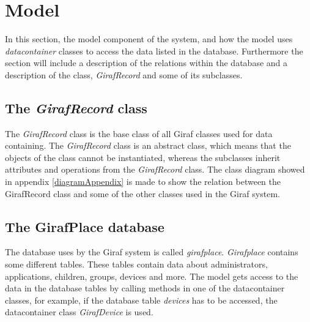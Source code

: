 \section{Model}
\label{model}

In this section, the model component of the system, and how the model uses \textit{datacontainer} classes to access the data listed in the database. Furthermore the section will include a description of the relations within the database and a description of the class, \textit{GirafRecord} and some of its subclasses.

\subsection{The \textit{GirafRecord} class}
The \textit{GirafRecord} class is the base class of all Giraf classes used for data containing. The \textit{GirafRecord} class is an abstract class, which means that the objects of the class cannot be instantiated, whereas the subclasses inherit attributes and operations from the \textit{GirafRecord} class. 
The class diagram showed in appendix \ref{diagramAppendix} is made to show the relation between the GirafRecord class and some of the other classes used in the Giraf system.
 


\subsection{The GirafPlace database}
The database uses by the Giraf system is called \textit{girafplace}. \textit{Girafplace} contains some different tables. These tables contain data about administrators, applications, children, groups, devices and more.
The model gets access to the data in the database tables by calling methods in one of the datacontainer classes, for example, if the database table \textit{devices} has to be accessed, the datacontainer class \textit{GirafDevice} is used. 

